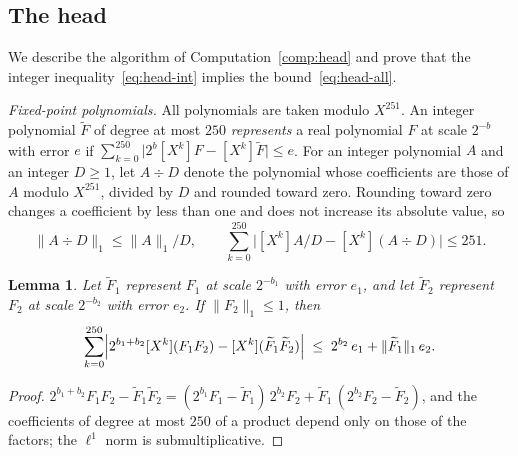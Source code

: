 \documentclass[11pt,reqno]{amsart}
\newtheorem{lemma}[theorem]{Lemma}
\theoremstyle{definition}
\numberwithin{equation}{section}
\newcommand{\lone}[1]{\|#1\|_1}
\begin{document}
\subsection{The head}\label{app:head}
We describe the algorithm of Computation~\ref{comp:head} and prove that the integer inequality~\eqref{eq:head-int} implies the bound~\eqref{eq:head-all}.

\emph{Fixed-point polynomials.} All polynomials are taken modulo $X^{251}$. An integer polynomial $\widetilde F$ of degree at most $250$ \emph{represents} a real polynomial $F$ at scale $2^{-b}$ with error $e$ if $\sum_{k=0}^{250}\bigl|2^{b}[X^k]F-[X^k]\widetilde F\bigr|\le e$. For an integer polynomial $A$ and an integer $D\ge1$, let $A\div D$ denote the polynomial whose coefficients are those of $A$ modulo $X^{251}$, divided by $D$ and rounded toward zero. Rounding toward zero changes a coefficient by less than one and does not increase its absolute value, so
\begin{equation}\label{eq:trunc}
  \lone{A\div D}\le\lone{A}/D,\qquad \sum_{k=0}^{250}\bigl|[X^k]A/D-[X^k](A\div D)\bigr|\le251 .
\end{equation}

\begin{lemma}\label{lem:fp-mult}
Let $\widetilde F_1$ represent $F_1$ at scale $2^{-b_1}$ with error $e_1$, and let $\widetilde F_2$ represent $F_2$ at scale $2^{-b_2}$ with error $e_2$. If $\lone{F_2}\le1$, then
\[
  \sum_{k=0}^{250}\Bigl|2^{b_1+b_2}[X^k](F_1F_2)-[X^k](\widetilde F_1\widetilde F_2)\Bigr|\;\le\;2^{b_2}\,e_1+\lone{\widetilde F_1}\,e_2 .
\]
\end{lemma}

\begin{proof}
$2^{b_1+b_2}F_1F_2-\widetilde F_1\widetilde F_2=(2^{b_1}F_1-\widetilde F_1)\,2^{b_2}F_2+\widetilde F_1\,(2^{b_2}F_2-\widetilde F_2)$, and the coefficients of degree at most $250$ of a product depend only on those of the factors; the $\ell^1$ norm is submultiplicative.
\end{proof}
\end{document}
